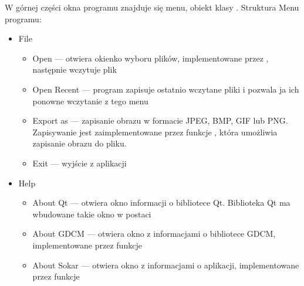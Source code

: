 \par
W górnej części okna programu znajduje się menu, obiekt klasy .
Struktura Menu programu:
\begin{itemize}
    \item File
          \begin{itemize}
              \item Open --- otwiera okienko wyboru plików, implementowane przez , następnie wczytuje plik
              \item Open Recent --- program zapisuje ostatnio wczytane pliki i pozwala ja ich ponowne wczytanie z tego menu
              \item Export as --- zapisanie obrazu w formacie JPEG, BMP, GIF lub PNG.
                    Zapisywanie jest zaimplementowane przez funkcje , która umożliwia zapisanie obrazu do pliku.
              \item Exit --- wyjście z aplikacji
          \end{itemize}
    \item Help
          \begin{itemize}
              \item About Qt --- otwiera okno informacji o bibliotece Qt.
                    Biblioteka Qt ma wbudowane takie okno w postaci 
              \item About GDCM --- otwiera okno z informacjami o bibliotece GDCM, implementowane przez funkcje 
              \item About Sokar --- otwiera okno z informacjami o aplikacji, implementowane przez funkcje 
          \end{itemize}
\end{itemize}